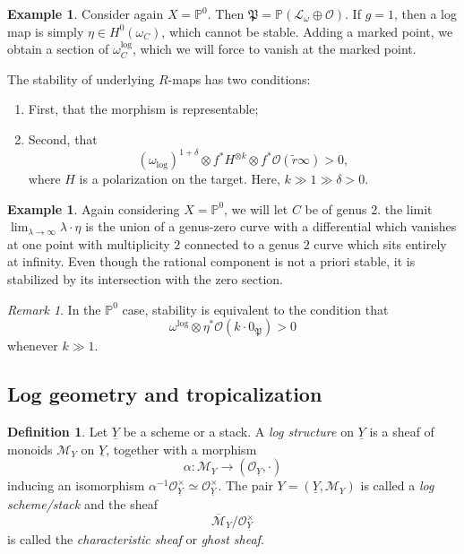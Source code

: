 \documentclass[10pt,oldfontcommands,oneside]{memoir}
\theoremstyle{definition}
\newtheorem{defn}[thm]{Definition}
\newtheorem{exm}[thm]{Example}
\theoremstyle{remark}
\newtheorem{rmk}[thm]{Remark}
\theoremstyle{plain}
\theoremstyle{definition}
\theoremstyle{remark}
\renewcommand{\P}{\mathbb{P}}
\newcommand{\mc}[1]{\mathcal{#1}}
\newcommand{\mf}[1]{\mathfrak{#1}}
\newcommand{\ol}[1]{\overline{#1}}
\newcommand{\ul}[1]{\underline{#1}}
\newcommand{\1}{\mathbf{1}}
\newcommand{\2}{\mathbf{2}}
\newcommand{\3}{\mathbf{3}}
\begin{document}
\begin{exm}
    Consider again $X = \P^0$. Then $\mf{P} = \P(\mc{L}_{\omega} \oplus \mc{O})$. If $g=1$, then a log map is simply $\eta \in H^0(\omega_C)$, which cannot be stable. Adding a marked point, we obtain a section of $\omega_C^{\log}$, which we will force to vanish at the marked point.
\end{exm}

The stability of underlying $R$-maps has two conditions:
\begin{enumerate}
    \item First, that the morphism is representable;
    \item Second, that
        \[ (\omega_{\log})^{1+\delta} \otimes f^* H^{\otimes k} \otimes f^* \mc{O}(\tilde{r}\infty) > 0, \]
        where $H$ is a polarization on the target. Here, $k \gg 1 \gg \delta > 0$.
\end{enumerate}

\begin{exm}
    Again considering $X = \P^0$, we will let $C$ be of genus $2$. the limit $\lim_{\lambda \to \infty} \lambda \cdot \eta$ is the union of a genus-zero curve with a differential which vanishes at one point with multiplicity $2$ connected to a genus $2$ curve which sits entirely at infinity. Even though the rational component is not a priori stable, it is stabilized by its intersection with the zero section.
\end{exm}

\begin{rmk}
    In the $\P^0$ case, stability is equivalent to the condition that
    \[ \omega^{\log} \otimes \eta^* \mc{O}(k \cdot 0_{\mf{P}}) > 0 \]
    whenever $k \gg 1$.
\end{rmk}

\subsection{Log geometry and tropicalization}%
\label{sub:Log geometry and tropicalization}


\begin{defn}
    Let $\ul{Y}$ be a scheme or a stack. A \textit{log structure} on $\ul{Y}$ is a sheaf of monoids $\mc{M}_Y$ on $\ul{Y}$, together with a morphism
    \[ \alpha \colon \mc{M}_Y \to (\mc{O}_{\ul{Y}}, \cdot) \]
    inducing an isomorphism $\alpha^{-1} \mc{O}_{\ul{Y}}^{\times} \simeq \mc{O}_{\ul{Y}}^{\times}$. The pair $Y = (\ul{Y}, \mc{M}_Y)$ is called a \textit{log scheme/stack} and the sheaf
    \[ \ol{\mc{M}}_{Y}/\mc{O}_{\ul{Y}}^{\times} \]
    is called the \textit{characteristic sheaf} or \textit{ghost sheaf}.
\end{defn}
\end{document}
